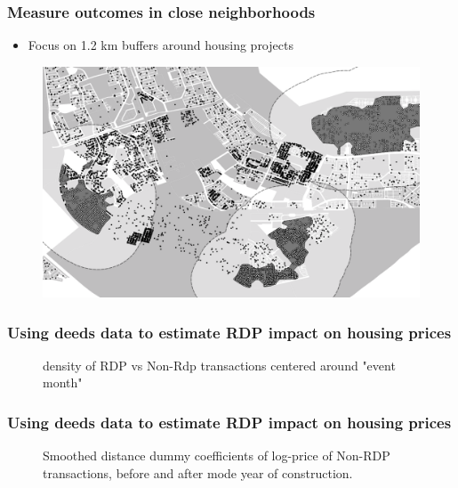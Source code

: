 \documentclass[aspectratio=149]{beamer}
\begin{document}

\begin{frame}
\frametitle{Measure outcomes in close neighborhoods}
\begin{itemize}
  \item Focus on 1.2 km buffers around housing projects
\end{itemize}

\begin{center}
\begin{figure}
\includegraphics[scale=0.30]{design2.png}
\vspace{-3mm}
\end{figure}
\end{center}

\end{frame}


\begin{frame}
\frametitle{Using deeds data to estimate RDP impact on housing prices}

\begin{center}
\begin{figure}
\vspace{-3mm}
\caption{density of RDP vs Non-Rdp transactions centered around "event month"}
\end{figure}
\end{center}


\end{frame}


\begin{frame}
\frametitle{Using deeds data to estimate RDP impact on housing prices}

\begin{center}
\begin{figure}
\vspace{-3mm}
\caption{Smoothed distance dummy coefficients of log-price of Non-RDP transactions, before and after mode year of construction.}
\end{figure}
\end{center}


\end{frame}
\end{document}
